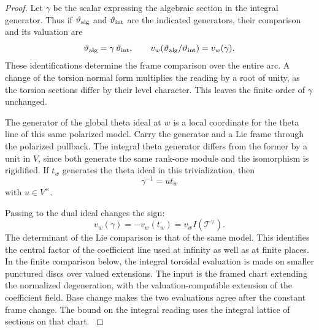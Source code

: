 \begin{proof}
Let
\(\gamma\) be the scalar expressing the algebraic section in the
integral generator.
Thus if \(\vartheta_{\rm alg}\) and \(\vartheta_{\rm int}\) are the indicated generators, their comparison and its valuation are
\[
  \vartheta_{\rm alg}=\gamma\,\vartheta_{\rm int},\qquad v_w(\vartheta_{\rm alg}/\vartheta_{\rm int})=v_w(\gamma).
\]
 These identifications determine the frame
comparison over the entire arc. A change of the torsion
normal form multiplies the reading by a root of unity, as the
torsion sections differ by their level character. This leaves the
finite order of \(\gamma\) unchanged.
\cite{faltings-chai}\label{cor:slice-cm-arc-model-4}

The generator of the global theta ideal at \(w\) is a local
coordinate for the theta line of this same polarized model.
Carry the generator and a Lie frame through the polarized
pullback. The integral theta generator differs from the former
by a unit in \(V\), since both generate the same rank-one module
and the isomorphism is rigidified. If \(t_w\) generates the theta ideal in this trivialization,
then 
\[
  \gamma^{-1}=u t_w
\]
 with \(u\in V^\times\).

Passing to the dual
ideal changes the sign:
\[
 v_w(\gamma)=-v_w(t_w)=v_w I(\mathcal T^\vee).
\] The determinant
of the Lie comparison is that of the same model. This identifies
the central factor of the coefficient line used at infinity as
well as at finite places. In the finite comparison below, the
integral toroidal evaluation is made on smaller punctured discs
over valued extensions. The input is the framed chart extending
the normalized degeneration, with the valuation-compatible
extension of the coefficient field. Base change makes the two
evaluations agree after the constant frame change. The bound on
the integral reading uses the integral lattice of sections on
that chart.
\label{cor:slice-cm-arc-model-5}
\end{proof}
